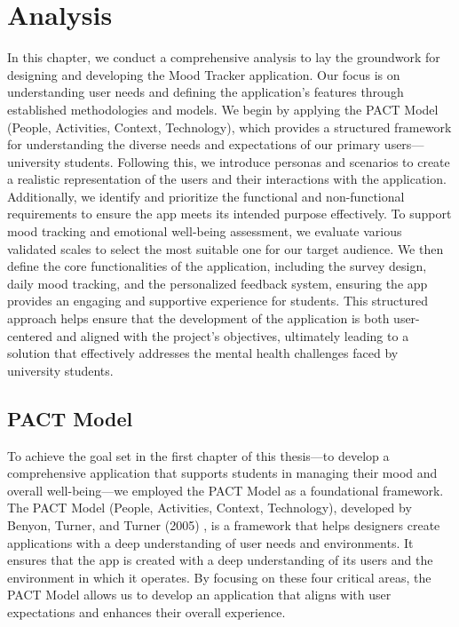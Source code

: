 \chapter{Analysis}

In this chapter, we conduct a comprehensive analysis to lay the groundwork for designing and developing the Mood Tracker application. Our focus is on understanding user needs and defining the application’s features through established methodologies and models. We begin by applying the PACT Model (People, Activities, Context, Technology), which provides a structured framework for understanding the diverse needs and expectations of our primary users—university students. Following this, we introduce personas and scenarios to create a realistic representation of the users and their interactions with the application.\vspace{5mm} \\
Additionally, we identify and prioritize the functional and non-functional requirements to ensure the app meets its intended purpose effectively. To support mood tracking and emotional well-being assessment, we evaluate various validated scales to select the most suitable one for our target audience. We then define the core functionalities of the application, including the survey design, daily mood tracking, and the personalized feedback system, ensuring the app provides an engaging and supportive experience for students. This structured approach helps ensure that the development of the application is both user-centered and aligned with the project’s objectives, ultimately leading to a solution that effectively addresses the mental health challenges faced by university students.

\section{PACT Model}

To achieve the goal set in the first chapter of this thesis—to develop a comprehensive application that supports students in managing their mood and overall well-being—we employed the PACT Model as a foundational framework. The PACT Model (People, Activities, Context, Technology), developed by Benyon, Turner, and Turner (2005) \cite{pact-model}, is a framework that helps designers create applications with a deep understanding of user needs and environments. It ensures that the app is created with a deep understanding of its users and the environment in which it operates. By focusing on these four critical areas, the PACT Model allows us to develop an application that aligns with user expectations and enhances their overall experience.

